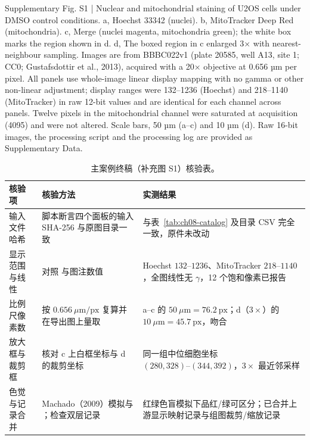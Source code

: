\begin{Prompt}
Supplementary Fig. S1 | Nuclear and mitochondrial staining of U2OS cells under DMSO control
conditions. a, Hoechst 33342 (nuclei). b, MitoTracker Deep Red (mitochondria). c, Merge
(nuclei magenta, mitochondria green); the white box marks the region shown in d. d, The
boxed region in c enlarged 3× with nearest-neighbour sampling. Images are from BBBC022v1
(plate 20585, well A13, site 1; CC0; Gustafsdottir et al., 2013), acquired with a 20×
objective at 0.656 µm per pixel. All panels use whole-image linear display mapping with no
gamma or other non-linear adjustment; display ranges were 132–1236 (Hoechst) and 218–1140
(MitoTracker) in raw 12-bit values and are identical for each channel across panels. Twelve
pixels in the mitochondrial channel were saturated at acquisition (4095) and were not
altered. Scale bars, 50 µm (a–c) and 10 µm (d). Raw 16-bit images, the processing script
and the processing log are provided as Supplementary Data.
\end{Prompt}

\begin{table}[htbp]\centering\footnotesize
\setlength{\tabcolsep}{3pt}
\renewcommand{\arraystretch}{1.15}
\caption{主案例终稿（补充图 S1）核验表。}\label{tab:ch08-verify}
\begin{tabularx}{\linewidth}{@{}>{\raggedright\arraybackslash}p{25mm}YY@{}}
\toprule
\textbf{核验项} & \textbf{核验方法} & \textbf{实测结果} \\
\midrule
输入文件哈希 & 脚本断言四个面板的输入 SHA-256 与原图目录一致 & 与表~\ref{tab:ch08-catalog} 及目录 CSV 完全一致，原件未改动 \\
显示范围与线性 & 对照  与图注数值 & Hoechst $132\text{--}1236$、MitoTracker $218\text{--}1140$，全图线性无 $\gamma$，12 个饱和像素已报告 \\
比例尺像素数 & 按 $0.656\ \mu\text{m/px}$ 复算并在导出图上量取 & a--c 的 $50\ \mu\text{m} = 76.2\ \text{px}$；d（$3\times$）的 $10\ \mu\text{m} = 45.7\ \text{px}$，吻合 \\
放大框与裁剪框 & 核对 c 上白框坐标与 d 的裁剪坐标 & 同一组中位细胞坐标 $(280, 328)\text{--}(344, 392)$，$3\times$ 最近邻采样 \\
色觉与记录合并 & Machado（2009）模拟与 ；检查双层记录 & 红绿色盲模拟下品红/绿可区分；已合并上游显示映射记录与组图裁剪/缩放记录 \\
\bottomrule
\end{tabularx}
\end{table}

